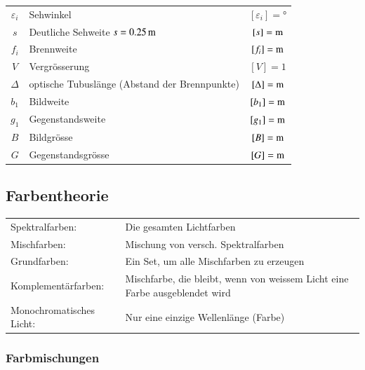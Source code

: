 \begin{tabular}{c l c}
	$\varepsilon_i$ & Sehwinkel & $[\varepsilon_i] =$° \\
	$s$ & Deutliche Sehweite $s =0.25 \, \mathrm{m}$ & $[s] = \mathrm{m}$ \\
	$f_i$ & Brennweite & $[f_i] = \mathrm{m}$ \\
	$V$ & Vergrösserung & $[V] = 1$ \\
	$\Delta$ & optische Tubuslänge (Abstand der Brennpunkte) & $[\Delta] = \mathrm{m}$ \\
	$b_1$ & Bildweite & $[b_1] = \mathrm{m}$ \\
	$g_1$ & Gegenstandsweite & $[g_1] = \mathrm{m}$ \\
	$B$ & Bildgrösse & $[B] = \mathrm{m}$ \\
	$G$ & Gegenstandsgrösse & $[G] = \mathrm{m}$
\end{tabular}






\subsection{Farbentheorie}

\begin{tabularx}{\linewidth}{lX}
	Spektralfarben: & Die gesamten Lichtfarben \\
	Mischfarben:    & Mischung von versch. Spektralfarben \\
	Grundfarben:    & Ein Set, um alle Mischfarben zu erzeugen \\
	Komplementärfarben: & Mischfarbe, die bleibt, wenn von weissem Licht eine Farbe ausgeblendet wird \\
	Monochromatisches Licht: & Nur eine einzige Wellenlänge (Farbe) 
\end{tabularx}



\subsubsection{Farbmischungen}

